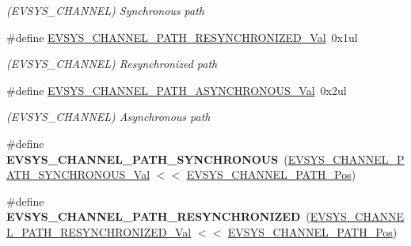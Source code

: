 \begin{DoxyCompactItemize}
\begin{DoxyCompactList}\small\item\em (E\+V\+S\+Y\+S\+\_\+\+C\+H\+A\+N\+N\+E\+L) Synchronous path \end{DoxyCompactList}\item 
\hypertarget{group___s_a_m_l21___e_v_s_y_s_gaeb385f0d13f51660c582fb7e8d5a753a}{}\#define \hyperlink{group___s_a_m_l21___e_v_s_y_s_gaeb385f0d13f51660c582fb7e8d5a753a}{E\+V\+S\+Y\+S\+\_\+\+C\+H\+A\+N\+N\+E\+L\+\_\+\+P\+A\+T\+H\+\_\+\+R\+E\+S\+Y\+N\+C\+H\+R\+O\+N\+I\+Z\+E\+D\+\_\+\+Val}~0x1ul\label{group___s_a_m_l21___e_v_s_y_s_gaeb385f0d13f51660c582fb7e8d5a753a}

\begin{DoxyCompactList}\small\item\em (E\+V\+S\+Y\+S\+\_\+\+C\+H\+A\+N\+N\+E\+L) Resynchronized path \end{DoxyCompactList}\item 
\hypertarget{group___s_a_m_l21___e_v_s_y_s_gae66529525c793ce0b4621730bd6d5944}{}\#define \hyperlink{group___s_a_m_l21___e_v_s_y_s_gae66529525c793ce0b4621730bd6d5944}{E\+V\+S\+Y\+S\+\_\+\+C\+H\+A\+N\+N\+E\+L\+\_\+\+P\+A\+T\+H\+\_\+\+A\+S\+Y\+N\+C\+H\+R\+O\+N\+O\+U\+S\+\_\+\+Val}~0x2ul\label{group___s_a_m_l21___e_v_s_y_s_gae66529525c793ce0b4621730bd6d5944}

\begin{DoxyCompactList}\small\item\em (E\+V\+S\+Y\+S\+\_\+\+C\+H\+A\+N\+N\+E\+L) Asynchronous path \end{DoxyCompactList}\item 
\hypertarget{group___s_a_m_l21___e_v_s_y_s_ga78540f1cb8959a2498387637223852d5}{}\#define {\bfseries E\+V\+S\+Y\+S\+\_\+\+C\+H\+A\+N\+N\+E\+L\+\_\+\+P\+A\+T\+H\+\_\+\+S\+Y\+N\+C\+H\+R\+O\+N\+O\+U\+S}~(\hyperlink{group___s_a_m_l21___e_v_s_y_s_gaf113bdb42f1664532afb160e78b39fdb}{E\+V\+S\+Y\+S\+\_\+\+C\+H\+A\+N\+N\+E\+L\+\_\+\+P\+A\+T\+H\+\_\+\+S\+Y\+N\+C\+H\+R\+O\+N\+O\+U\+S\+\_\+\+Val} $<$$<$ \hyperlink{group___s_a_m_l21___e_v_s_y_s_ga1c99b6755155dc2b405c63587973570b}{E\+V\+S\+Y\+S\+\_\+\+C\+H\+A\+N\+N\+E\+L\+\_\+\+P\+A\+T\+H\+\_\+\+Pos})\label{group___s_a_m_l21___e_v_s_y_s_ga78540f1cb8959a2498387637223852d5}

\item 
\hypertarget{group___s_a_m_l21___e_v_s_y_s_ga1c73b14174899488574ae0456c40ce10}{}\#define {\bfseries E\+V\+S\+Y\+S\+\_\+\+C\+H\+A\+N\+N\+E\+L\+\_\+\+P\+A\+T\+H\+\_\+\+R\+E\+S\+Y\+N\+C\+H\+R\+O\+N\+I\+Z\+E\+D}~(\hyperlink{group___s_a_m_l21___e_v_s_y_s_gaeb385f0d13f51660c582fb7e8d5a753a}{E\+V\+S\+Y\+S\+\_\+\+C\+H\+A\+N\+N\+E\+L\+\_\+\+P\+A\+T\+H\+\_\+\+R\+E\+S\+Y\+N\+C\+H\+R\+O\+N\+I\+Z\+E\+D\+\_\+\+Val} $<$$<$ \hyperlink{group___s_a_m_l21___e_v_s_y_s_ga1c99b6755155dc2b405c63587973570b}{E\+V\+S\+Y\+S\+\_\+\+C\+H\+A\+N\+N\+E\+L\+\_\+\+P\+A\+T\+H\+\_\+\+Pos})\label{group___s_a_m_l21___e_v_s_y_s_ga1c73b14174899488574ae0456c40ce10}


\end{DoxyCompactItemize}
